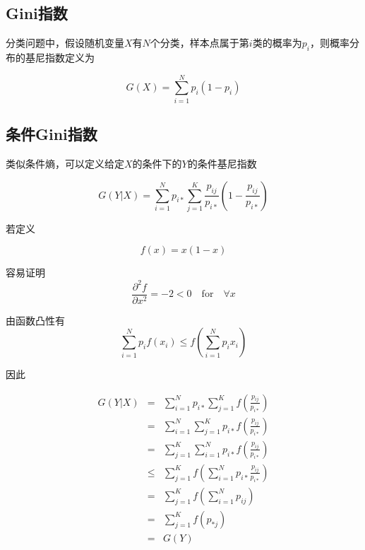 \subsection{Gini指数}

分类问题中，假设随机变量$X$有$N$个分类，样本点属于第$i$类的概率为$p_i$，则概率分布的基尼指数定义为

\begin{equation*}
    G(X) = \sum_{i=1}^Np_i(1-p_i)
\end{equation*}

\subsection{条件Gini指数}

类似条件熵，可以定义给定$X$的条件下的$Y$的条件基尼指数

\begin{equation*}
    G(Y|X) = \sum_{i=1}^Np_{i*}\sum_{j=1}^K\frac{p_{ij}}{p_{i*}}(1 - \frac{p_{ij}}{p_{i*}})
\end{equation*}

若定义

\begin{equation*}
    f(x) = x(1 - x)
\end{equation*}

容易证明
\begin{equation*}
    \frac{\partial^2 f}{\partial x^2} = -2 < 0 \quad \text{for} \quad \forall x
\end{equation*}

由函数凸性有
\begin{equation*}
    \sum_{i=1}^N p_i f(x_i) \leq f(\sum_{i=1}^N p_i x_i)
\end{equation*}

因此

\begin{equation*}
    \begin{array}{rcl}
        G(Y|X) & =    & \sum_{i=1}^Np_{i*}\sum_{j=1}^Kf(\frac{p_{ij}}{p_{i*}}) \\
               & =    & \sum_{i=1}^N\sum_{j=1}^Kp_{i*}f(\frac{p_{ij}}{p_{i*}}) \\
               & =    & \sum_{j=1}^K\sum_{i=1}^Np_{i*}f(\frac{p_{ij}}{p_{i*}}) \\
               & \leq & \sum_{j=1}^Kf(\sum_{i=1}^Np_{i*}\frac{p_{ij}}{p_{i*}}) \\
               & =    & \sum_{j=1}^Kf(\sum_{i=1}^Np_{ij})                      \\
               & =    & \sum_{j=1}^Kf(p_{*j})                                  \\
               & =    & G(Y)
    \end{array}
\end{equation*}